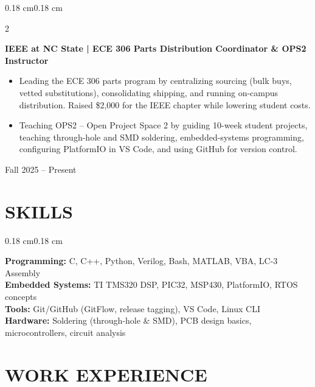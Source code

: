 \documentclass[10pt, letterpaper]{article}
\newenvironment{highlights}{
    \begin{itemize}[
        topsep=0pt,
        parsep=0pt,
        partopsep=0pt,
        itemsep=0pt,
        leftmargin=0.30 cm + 8pt
    ]
}{
    \end{itemize}
}
\newenvironment{onecolentry}{
    \begin{adjustwidth}{0.18 cm}{0.18 cm}
}{
    \end{adjustwidth}
}
\newenvironment{twocolentry}[2][]{
    \onecolentry
    \def\secondColumn{#2}
    \setcolumnwidth{\fill, 4.2 cm}
    \begin{paracol}{2}
}{
    \switchcolumn \raggedleft \secondColumn
    \end{paracol}
    \endonecolentry
}
\begin{document}
\begin{twocolentry}{Fall 2025 -- Present}
    \textbf{IEEE at NC State \;| \; ECE 306 Parts Distribution Coordinator \& OPS2 Instructor}
    \begin{highlights}
        \item[\textbf{$\vartriangleright$}] Leading the ECE 306 parts program by centralizing sourcing (bulk buys, vetted substitutions), consolidating shipping, and running on-campus distribution. Raised \$2{,}000 for the IEEE chapter while lowering student costs.
        \item[\textbf{$\vartriangleright$}] Teaching OPS2 -- Open Project Space 2 by guiding 10-week student projects, teaching through-hole and SMD soldering, embedded-systems programming, configuring PlatformIO in VS Code, and using GitHub for version control.
    \end{highlights}
\end{twocolentry}


\vspace{7pt}

\section{SKILLS}
\begin{onecolentry}
\textbf{Programming:} C, C++, Python, Verilog, Bash, MATLAB, VBA, LC-3 Assembly \\
\textbf{Embedded Systems:} TI TMS320 DSP, PIC32, MSP430, PlatformIO, RTOS concepts \\
\textbf{Tools:} Git/GitHub (GitFlow, release tagging), VS Code, Linux CLI \\
\textbf{Hardware:} Soldering (through-hole \& SMD), PCB design basics, microcontrollers, circuit analysis
\end{onecolentry}


\vspace{7pt}
\section{WORK EXPERIENCE}
\end{document}

